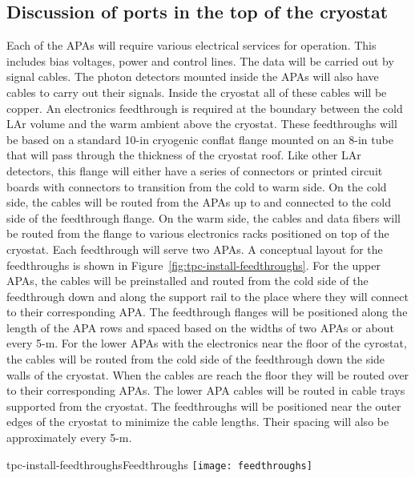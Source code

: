 \subsection{Discussion of ports in the top of the cryostat}
\label{fd:install:integ:topports}

Each of the APAs will require various electrical services for operation.  This includes bias voltages, power and control lines.  The data will be carried out by signal cables.  The photon detectors mounted inside the APAs will also have cables to carry out their signals.  Inside the cryostat all of these cables will be copper.  
An electronics feedthrough is required at the boundary between the cold LAr volume and the warm ambient above the cryostat.  These feedthroughs will be based on a standard 10-in cryogenic conflat flange mounted on an 8-in tube that will pass through the thickness of the cryostat roof.  Like other LAr detectors, this flange will either have a series of connectors or printed circuit boards with connectors to transition from the cold to warm side.  On the cold side, the cables will be routed from the APAs up to and connected to the cold side of the feedthrough flange.  On the warm side, the cables and data fibers will be routed from the flange to various electronics racks positioned on top of the cryostat.  
Each feedthrough will serve two APAs.  A conceptual layout for the feedthroughs is shown in Figure~\ref{fig:tpc-install-feedthroughs}.  For the upper APAs, the cables will be preinstalled and routed from the cold side of the feedthrough down and along the support rail to the place where they will connect to their corresponding APA.  The feedthrough flanges will be positioned along the length of the APA rows and spaced based on the widths of two APAs or about every 5-m.   For the lower APAs with the electronics near the floor of the cyrostat, the cables will be routed from the cold side of the feedthrough down the side walls of the cryostat.  When the cables are reach the floor they will be routed over to their corresponding APAs.  The lower APA cables will be routed in cable trays supported from the cryostat.  The feedthroughs will be positioned near the outer edges of the cryostat to minimize the cable lengths.  Their spacing will also be approximately every 5-m.  

\begin{cdrfigure}[Feedthroughs]{tpc-install-feedthroughs}{Feedthroughs}
\texttt{[image: feedthroughs]}
\end{cdrfigure}



